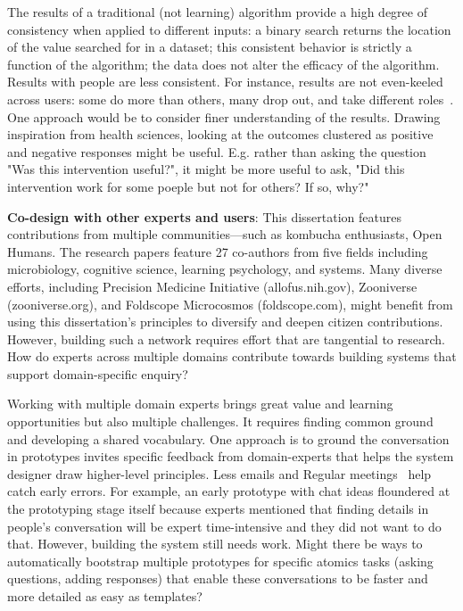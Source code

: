 The results of a traditional (not learning) algorithm provide a high degree of consistency when applied to different inputs: a binary search returns the location of the value searched for in a dataset; this consistent behavior is strictly a function of the algorithm; the data does not alter the efficacy of the algorithm. Results with people are less consistent. For instance, results are not even-keeled across users: some do more than others, many drop out, and take different roles~\cite{Bryant2005}. One approach would be to consider finer understanding of the results. Drawing inspiration from health sciences, looking at the outcomes clustered as positive and negative responses might be useful. E.g. rather than asking the question "Was this intervention useful?", it might be more useful to ask, "Did this intervention work for some poeple but not for others? If so, why?"



\textbf{Co-design with other experts and users}: This dissertation features contributions from multiple communities—such as kombucha enthusiasts, Open Humans. The research papers feature 27 co-authors from five fields including microbiology, cognitive science, learning psychology, and systems. Many diverse efforts, including Precision Medicine Initiative (allofus.nih.gov), Zooniverse (zooniverse.org), and Foldscope Microcosmos (foldscope.com), might benefit from using this dissertation’s principles to diversify and deepen citizen contributions. However, building such a network requires effort that are tangential to research. How do experts across multiple domains contribute towards building systems that support domain-specific enquiry? 

Working with multiple domain experts brings great value and learning opportunities but also multiple challenges. It requires finding common ground and developing a shared vocabulary. One approach is to ground the conversation in prototypes invites specific feedback from domain-experts that helps the system designer draw higher-level principles. Less emails and Regular meetings~\cite{rocco1998trust} help catch early errors. For example, an early prototype with chat ideas floundered at the prototyping stage itself because experts mentioned that finding details in people's conversation will be expert time-intensive and they did not want to do that. However, building the system still needs work. Might there be ways to automatically bootstrap multiple prototypes for specific atomics tasks (asking questions, adding responses) that enable these conversations to be faster and more detailed as easy as templates? 

